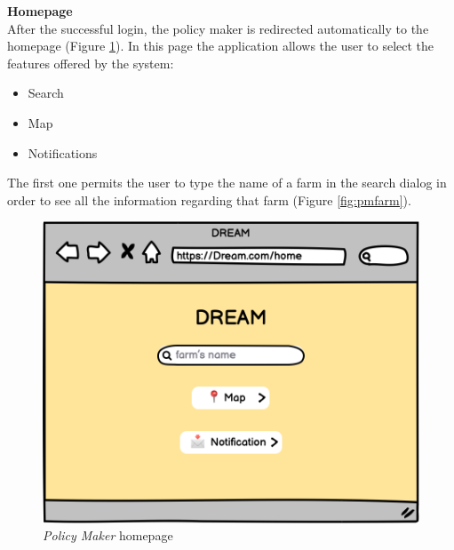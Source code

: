 \textbf{Homepage} \\
After the successful login, the policy maker is redirected automatically to the homepage (Figure \ref{fig:pmhome}). 
In this page the application allows the user to select the features offered by the system:
\begin{itemize}
    \item Search
    \item Map
    \item Notifications
\end{itemize}
The first one permits the user to type the name of a farm in the search dialog in order to see all the information regarding that farm (Figure \ref{fig:pmfarm}).

\begin{figure}[H]
    \begin{minipage}{0.4\textwidth}
        \centering
        \includegraphics[width=1\textwidth]{images/mockups/PMHome.png}
        \caption{\emph{Policy Maker} homepage}
        \label{fig:pmhome}
    \end{minipage}\hfill
    \begin{minipage}{0.39\textwidth}
        \centering

\end{minipage}
\end{figure}
